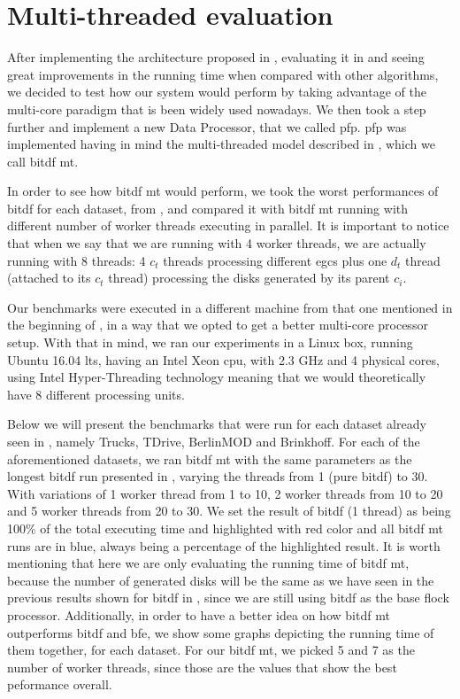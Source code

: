 {%
\section{Multi-threaded evaluation}
After implementing the architecture proposed in , evaluating it in  and
seeing great improvements in the running time when compared with other algorithms, we decided to test how our system
would perform by taking advantage of the multi-core paradigm that is been widely used nowadays. We then took a step
further and implement a new Data Processor, that we called \ac{pfp}. \ac{pfp} was implemented having in mind the
multi-threaded model described in , which we call \ac{bitdf} \ac{mt}.

In order to see how \ac{bitdf} \ac{mt} would perform, we took the worst performances of \ac{bitdf} for each dataset,
from , and compared it with \ac{bitdf} \ac{mt} running with different number of worker threads
executing in parallel. It is important to notice that when we say that we are running with 4 worker threads, we are
actually running with 8 threads: 4 $c_t$ threads processing different \ac{egc}s plus one $d_t$ thread (attached to its
$c_t$ thread) processing the disks generated by its parent $c_i$.

Our benchmarks were executed in a different machine from that one mentioned in the beginning of ,
in a way that we opted to get a better multi-core processor setup. With that in mind, we ran our experiments in a Linux
box, running Ubuntu 16.04 \ac{lts}, having an Intel Xeon \ac{cpu}, with 2.3 GHz and 4 physical cores, using Intel
Hyper-Threading technology \citep{hyper} meaning that we would theoretically have 8 different processing units.

Below we will present the benchmarks that were run for each dataset already seen in , namely
Trucks, TDrive, BerlinMOD and Brinkhoff. For each of the aforementioned datasets, we ran \ac{bitdf} \ac{mt} with the
same parameters as the longest \ac{bitdf} run presented in , varying the threads from 1 (pure
\ac{bitdf}) to 30.  With variations of 1 worker thread from 1 to 10, 2 worker threads from 10 to 20 and 5 worker threads
from 20 to 30. We set the result of \ac{bitdf} (1 thread) as being 100\% of the total executing time and highlighted
with red color and all \ac{bitdf} \ac{mt} runs are in blue, always being a percentage of the highlighted result. It is
worth mentioning that here we are only evaluating the running time of \ac{bitdf} \ac{mt}, because the number of
generated disks will be the same as we have seen in the previous results shown for \ac{bitdf} in ,
since we are still using \ac{bitdf} as the base flock processor. Additionally, in order to have a better idea on how
\ac{bitdf} \ac{mt} outperforms \ac{bitdf} and \ac{bfe}, we show some graphs depicting the running time of them together,
for each dataset. For our \ac{bitdf} \ac{mt}, we picked 5 and 7 as the number of worker threads, since those are the
values that show the best peformance overall.

}
